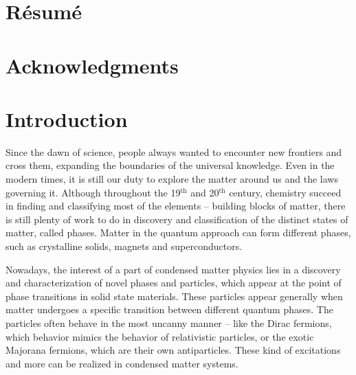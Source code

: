 \documentclass[titlepage,a4paper]{book}
\newcommand{\wciecie}{\quad\phantom{v}}
\begin{document}
\chapter*{Résumé}
\chapter*{Acknowledgments}
\wciecie

\clearpage
\tableofcontents


\newpage
\mainmatter
{}
\chapter{Introduction}
\label{chpt:Intro}
\wciecie
Since the dawn of science, people always wanted to encounter new frontiers and cross them, expanding the boundaries of the universal knowledge. Even in the modern times, it is still our duty to explore the matter around us and the laws governing it. Although throughout the 19$^{\mathrm{th}}$ and 20$^{\mathrm{th}}$ century, chemistry succeed in finding and classifying most of the elements -- building blocks of matter, there is still plenty of work to do in discovery and classification of the distinct states of matter, called phases. Matter in the quantum approach can form different phases, such as crystalline solids, magnets and superconductors.  

Nowadays, the interest of a part of condensed matter physics lies in a discovery and characterization of novel phases and particles, which appear at the point of phase transitions in solid state materials. These particles appear generally when matter undergoes a specific transition between different quantum phases. The particles often behave in the most uncanny manner -- like the Dirac fermions, which behavior mimics the behavior of relativistic particles, or the exotic Majorana fermions, which are their own antiparticles. These kind of excitations and more can be realized in condensed matter systems. 
\end{document}
